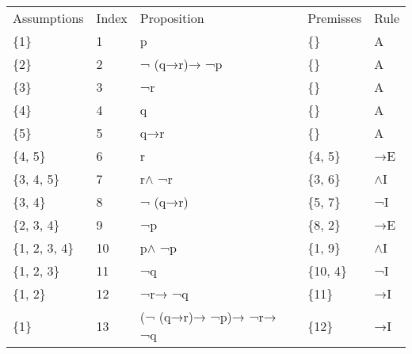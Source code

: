 \documentclass[a4paper,12pt]{book}
\begin{document}
\begin{tabular}{lllll}
\toprule
 Assumptions & Index &           Proposition & Premisses & Rule \\
         \{1\} &     1 &                     p &        \{\} &    A \\
\midrule
         \{2\} &     2 &           ¬ (q→r)→ ¬p &        \{\} &    A \\
         \{3\} &     3 &                    ¬r &        \{\} &    A \\
         \{4\} &     4 &                     q &        \{\} &    A \\
         \{5\} &     5 &                   q→r &        \{\} &    A \\
      \{4, 5\} &     6 &                     r &    \{4, 5\} &   →E \\
   \{3, 4, 5\} &     7 &                 r$\wedge$ ¬r &    \{3, 6\} &   $\wedge$I \\
      \{3, 4\} &     8 &               ¬ (q→r) &    \{5, 7\} &   ¬I \\
   \{2, 3, 4\} &     9 &                    ¬p &    \{8, 2\} &   →E \\
\{1, 2, 3, 4\} &    10 &                 p$\wedge$ ¬p &    \{1, 9\} &   $\wedge$I \\
   \{1, 2, 3\} &    11 &                    ¬q &   \{10, 4\} &   ¬I \\
      \{1, 2\} &    12 &                ¬r→ ¬q &      \{11\} &   →I \\
         \{1\} &    13 & (¬ (q→r)→ ¬p)→ ¬r→ ¬q &      \{12\} &   →I \\
\bottomrule
\end{tabular}
\end{document}
